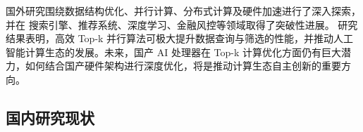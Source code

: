 

国外研究围绕数据结构优化、并行计算、分布式计算及硬件加速进行了深入探索，并在 搜索引擎、推荐系统、深度学习、金融风控等领域取得了突破性进展。
研究结果表明，高效 Top-k 并行算法可极大提升数据查询与筛选的性能，并推动人工智能计算生态的发展。未来，国产 AI 处理器在 Top-k 计算优化方面仍有巨大潜力，如何结合国产硬件架构进行深度优化，将是推动计算生态自主创新的重要方向。









\subsection{国内研究现状}


